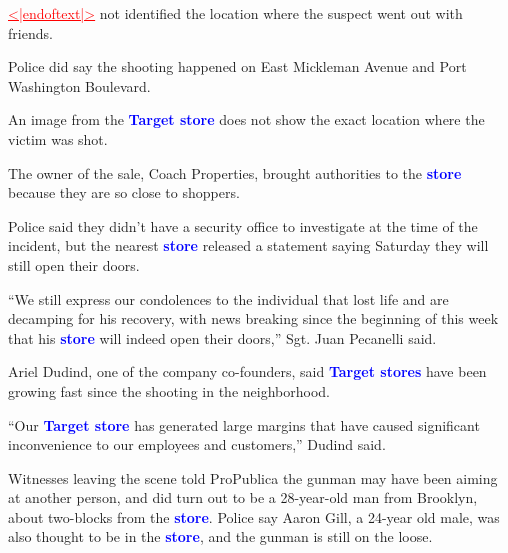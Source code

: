 \documentclass{article}
\begin{document}
\begin{samplebox}[title={\textsc{RePlaid} (s.c.), ancestral sampler, $T = 1024$ (GenPPL: $18.3$, Entropy: $5.21$, MAUVE: $0.85$)}]
\vspace{1em}

\textcolor{red}{\uline{<|endoftext|>}} not identified the location where the suspect went out with friends.

\vspace{1em}
Police did say the shooting happened on East Mickleman Avenue and Port Washington Boulevard.

\vspace{1em}
An image from the \textcolor{blue}{\textbf{Target store}} does not show the exact location where the victim was shot.

\vspace{1em}
The owner of the sale, Coach Properties, brought authorities to the \textcolor{blue}{\textbf{store}} because they are so close to shoppers.

\vspace{1em}
Police said they didn't have a security office to investigate at the time of the incident, but the nearest \textcolor{blue}{\textbf{store}} released a statement saying Saturday they will still open their doors.

\vspace{1em}
``We still express our condolences to the individual that lost life and are decamping for his recovery, with news breaking since the beginning of this week that his \textcolor{blue}{\textbf{store}} will indeed open their doors,'' Sgt. Juan Pecanelli said.

\vspace{1em}
Ariel Dudind, one of the company co-founders, said \textcolor{blue}{\textbf{Target stores}} have been growing fast since the shooting in the neighborhood.

\vspace{1em}
``Our \textcolor{blue}{\textbf{Target store}} has generated large margins that have caused significant inconvenience to our employees and customers,'' Dudind said.

\vspace{1em}
Witnesses leaving the scene told ProPublica the gunman may have been aiming at another person, and did turn out to be a 28-year-old man from Brooklyn, about two-blocks from the \textcolor{blue}{\textbf{store}}. Police say Aaron Gill, a 24-year old male, was also thought to be in the \textcolor{blue}{\textbf{store}}, and the gunman is still on the loose.


\end{samplebox}
\end{document}
